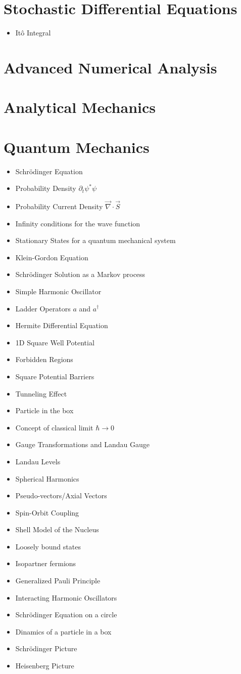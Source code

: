 \documentclass[10pt]{article}
\begin{document}
\section{Stochastic Differential Equations}
\begin{itemize}
	\item It\^o Integral
	\end{itemize}
\section{Advanced Numerical Analysis}
\section{Analytical Mechanics}
\section{Quantum Mechanics}
\begin{itemize}
	\item Schr\"odinger Equation
	\item Probability Density $\partial_t \psi^*\psi$
	\item Probability Current Density $\vec{\nabla}\cdot\vec{S}$
	\item Infinity conditions for the wave function
	\item Stationary States for a quantum mechanical system
	\item Klein-Gordon Equation
	\item Schr\"odinger Solution as a Markov process
	\item Simple Harmonic Oscillator
	\item Ladder Operators $a$ and $a^{\dag}$
	\item Hermite Differential Equation
	\item 1D Square Well Potential
	\item Forbidden Regions
	\item Square Potential Barriers
	\item Tunneling Effect
	\item Particle in the box
	\item Concept of classical limit $\hbar \to 0$
	\item Gauge Transformations and Landau Gauge
	\item Landau Levels
	\item Spherical Harmonics
	\item Pseudo-vectors/Axial Vectors
	\item Spin-Orbit Coupling
	\item Shell Model of the Nucleus
	\item Loosely bound states
	\item Isopartner fermions
	\item Generalized Pauli Principle
	\item Interacting Harmonic Oscillators
	\item Schr\"odinger Equation on a circle
	\item Dinamics of a particle in a box
	\item Schr\"odinger Picture
	\item Heisenberg Picture
\end{itemize}
\end{document}
